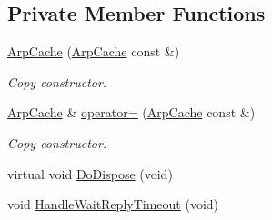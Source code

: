 \subsection*{Private Member Functions}
\begin{DoxyCompactItemize}
\item 
\hyperlink{classns3_1_1ArpCache_a480fe29c24f6e3cd7c0e8599425822e7}{Arp\+Cache} (\hyperlink{classns3_1_1ArpCache}{Arp\+Cache} const \&)
\begin{DoxyCompactList}\small\item\em Copy constructor. \end{DoxyCompactList}\item 
\hyperlink{classns3_1_1ArpCache}{Arp\+Cache} \& \hyperlink{classns3_1_1ArpCache_a5adcfb987247b1deeb5461b02d6ee460}{operator=} (\hyperlink{classns3_1_1ArpCache}{Arp\+Cache} const \&)
\begin{DoxyCompactList}\small\item\em Copy constructor. \end{DoxyCompactList}\item 
virtual void \hyperlink{classns3_1_1ArpCache_a82e8920743f9de62133e2b43071a171b}{Do\+Dispose} (void)
\item 
void \hyperlink{classns3_1_1ArpCache_a8922ac0806811b42957bfc68a3ccf1c6}{Handle\+Wait\+Reply\+Timeout} (void)
\end{DoxyCompactItemize}

